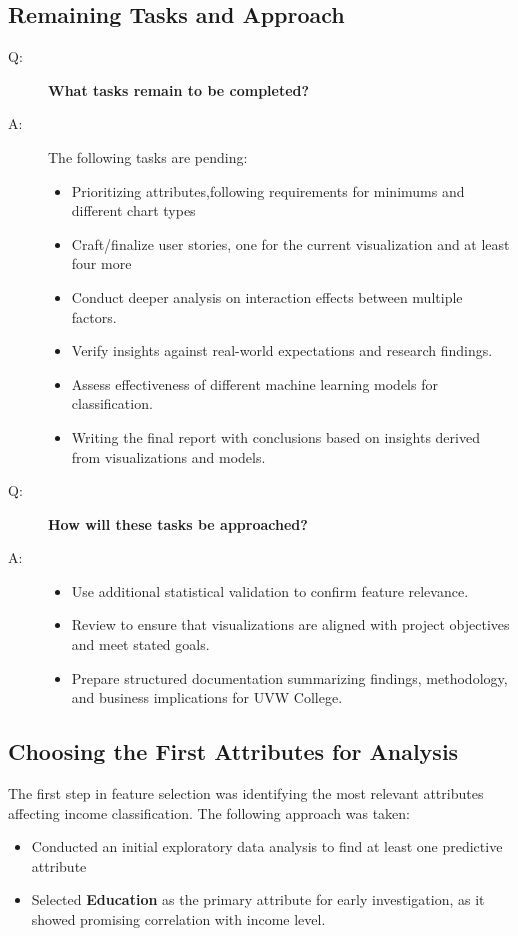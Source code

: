 \documentclass[journal]{IEEEtran}
\begin{document}
\subsection{Remaining Tasks and Approach}
\begin{description}
    \item[Q:] \textbf{What tasks remain to be completed?}
    \item[A:] The following tasks are pending:
    \begin{itemize}
        \item Prioritizing attributes,following requirements for minimums and different chart types
        \item Craft/finalize user stories, one for the current visualization and at least four more
        \item Conduct deeper analysis on interaction effects between multiple factors.
        \item Verify insights against real-world expectations and research findings.
        \item Assess effectiveness of different machine learning models for classification.
        \item Writing the final report with conclusions based on insights derived from visualizations and models.
    \end{itemize}

    \item[Q:] \textbf{How will these tasks be approached?}
    \item[A:] 
    \begin{itemize}
        \item Use additional statistical validation to confirm feature relevance.
        \item Review to ensure that visualizations are aligned with project objectives and meet stated goals.
        \item Prepare structured documentation summarizing findings, methodology, and business implications for UVW College.
    \end{itemize}
\end{description}


\subsection{Choosing the First Attributes for Analysis}
The first step in feature selection was identifying the most relevant attributes affecting income classification. The following approach was taken:
\begin{itemize}
    \item Conducted an initial exploratory data analysis to find at least one predictive attribute
    \item Selected \textbf{Education} as the primary attribute for early investigation, as it showed promising correlation with income level.
\end{itemize}
\end{document}

